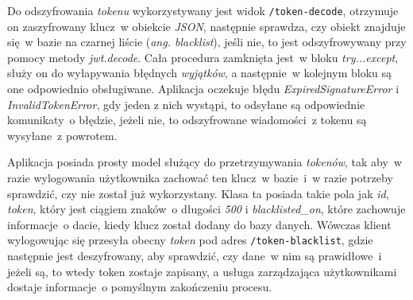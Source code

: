 Do odszyfrowania \textit{tokenu} wykorzystywany jest widok \verb|/token-decode|, otrzymuje on zaszyfrowany klucz~w obiekcie \textit{JSON}, następnie sprawdza, czy obiekt znajduje się~w bazie na czarnej liście (\textit{ang. blacklist}), jeśli nie, to jest odszyfrowywany przy pomocy metody \textit{jwt.decode}. Cała procedura zamknięta jest~w bloku \textit{try...except}, służy on do wyłapywania błędnych \textit{wyjątków}, a następnie~w kolejnym bloku są one odpowiednio obsługiwane\cite{python}. Aplikacja oczekuje błędu \textit{ExpiredSignatureError} i \textit{InvalidTokenError}, gdy jeden z nich wystąpi, to odsyłane są odpowiednie komunikaty~o błędzie, jeżeli nie, to odszyfrowane wiadomości~z tokenu są wysyłane~z powrotem.

Aplikacja posiada prosty model służący do przetrzymywania \textit{tokenów}, tak aby~w razie wylogowania użytkownika zachować ten klucz~w bazie~i~w razie potrzeby sprawdzić, czy nie został już wykorzystany. Klasa ta posiada takie pola jak \textit{id}, \textit{token}, który jest ciągiem znaków~o długości \textit{500} i \textit{blacklisted\_on}, które zachowuje informacje~o dacie, kiedy klucz został dodany do bazy danych. Wówczas klient wylogowując się przesyła obecny \textit{token} pod adres \verb|/token-blacklist|, gdzie następnie jest deszyfrowany, aby sprawdzić, czy dane~w nim są prawidłowe~i jeżeli są, to wtedy token zostaje zapisany, a usługa zarządzająca użytkownikami dostaje informacje~o pomyślnym zakończeniu procesu.

